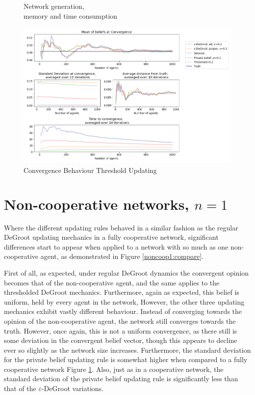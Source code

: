 \documentclass[a4paper, 12pt]{report}
\begin{document}
\begin{figure}[!htbp]
    \caption{Network generation, \\ memory and time consumption}
\end{figure}

\begin{center}
    \begin{figure}[!htbp]
        \centering
        \includegraphics[width=1.2\textwidth]{ThesisKI/Images/WisdomCompare0.png}
        \caption{Convergence Behaviour Threshold Updating}
        \label{coop:compare}
    \end{figure}
\end{center}

\newpage

\section{Non-cooperative networks, $n=1$}

Where the different updating rules behaved in a similar fashion as the regular DeGroot updating mechanics in a fully cooperative network, significant differences start to appear when applied to a network with so much as one non-cooperative agent, as demonstrated in Figure \ref{noncoop1:compare}. 

\noindent First of all, as expected, under regular DeGroot dynamics the convergent opinion becomes that of the non-cooperative agent, and the same applies to the thresholded DeGroot mechanics. Furthermore, again as expected, this belief is uniform, held by every agent in the network, However, the other three updating mechanics exhibit vastly different behaviour. Instead of converging towards the opinion of the non-cooperative agent, the network still converges towards the truth. However, once again, this is not a uniform convergence, as there still is some deviation in the convergent belief vector, though this appears to decline ever so slightly as the network size increases. Furthermore, the standard deviation for the private belief updating rule is somewhat higher when compared to a fully cooperative network Figure \ref{coop:compare}. Also, just as in a cooperative network, the standard deviation of the private belief updating rule is significantly less than that of the $\varepsilon$-DeGroot variations.
\end{document}
